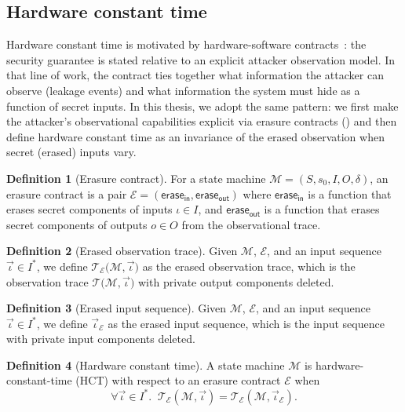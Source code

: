 \documentclass[fontset=fira-newtxsf]{mitthesis}
\theoremstyle{definition}
\newtheorem{definition}{Definition}[section]
\theoremstyle{plain}
\begin{document}
\subsection{Hardware constant time} \label{sec:hct}
Hardware constant time is motivated by hardware-software contracts~\cite{guarnieri2021}: the security guarantee is stated relative to an explicit attacker observation model. In that line of work, the contract ties together what information the attacker can observe (leakage events) and what information the system must hide as a function of secret inputs. In this thesis, we adopt the same pattern: we first make the attacker's observational capabilities explicit via erasure contracts () and then define hardware constant time as an invariance of the erased observation when secret (erased) inputs vary.

\begin{definition}[Erasure contract] \label{def:erasure-spec}
For a state machine $\mathcal{M}=(S,s_0,I,O,\delta)$, an erasure contract is a pair $\mathcal{E} = (\mathsf{erase_{in}}, \mathsf{erase_{out}})$ where $\mathsf{erase_{in}}$ is a function that erases secret components of inputs $\iota \in I$, and $\mathsf{erase_{out}}$ is a function that erases secret components of outputs $o \in O$ from the observational trace.
\end{definition}

\begin{definition}[Erased observation trace] \label{def:erased-run-outputs}
Given $\mathcal{M}$, $\mathcal{E}$, and an input sequence $\vec\iota \in I^*$, we define
$\mathcal{T}_{\mathcal{E}}\bigl( \mathcal{M}, \vec\iota \bigr)$ as the erased observation trace, which is the observation trace $\mathcal{T}\bigl( \mathcal{M}, \vec\iota \bigr)$ with private output components deleted.
\end{definition}

\begin{definition}[Erased input sequence] \label{def:erased-input-sequence}
Given $\mathcal{M}$, $\mathcal{E}$, and an input sequence $\vec\iota \in I^*$, we define
$\vec\iota_\mathcal{E}$ as the erased input sequence, which is the input sequence with private input components deleted.
\end{definition}

\begin{definition}[Hardware constant time] \label{def:hct-single}
A state machine $\mathcal{M}$ is hardware-constant-time (HCT) with respect to an erasure contract $\mathcal{E}$ when
\[
  \forall \vec\iota \in I^*.\;\;
  \mathcal{T}_\mathcal{E}(\mathcal{M}, \vec\iota)
  =
  \mathcal{T}_\mathcal{E}(\mathcal{M}, \vec\iota_\mathcal{E}).
\]
\end{definition}
\end{document}

